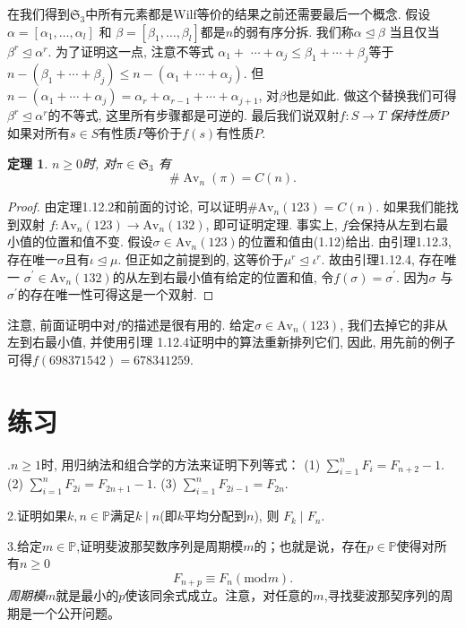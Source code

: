 \documentclass{ctexbook}
\newtheorem{thm}{定理}[section]
\begin{document}
在我们得到$\mathfrak{S}_{3}$中所有元素都是Wilf等价的结果之前还需要最后一个概念. 假设
$\alpha=\left[\alpha_{1}, \ldots, \alpha_{l}\right]$ 和 $\beta=\left[\beta_{1}, \ldots, \beta_{l}\right]$都是$n$的弱有序分拆.
我们称$\alpha \unlhd \beta$ 当且仅当 $\beta^{r} \unlhd \alpha^{r}$. 为了证明这一点, 注意不等式
$\alpha_{1}+$ $\cdots+\alpha_{j} \leqslant \beta_{1}+\cdots+\beta_{j}$等于
$n-\left(\beta_{1}+\cdots+\beta_{j}\right) \leqslant n-\left(\alpha_{1}+\cdots+\alpha_{j}\right)$.
但$n-\left(\alpha_{1}+\cdots+\alpha_{j}\right)=\alpha_{r}+\alpha_{r-1}+\cdots+\alpha_{j+1}$, 对$\beta$也是如此.
做这个替换我们可得$\beta^{r} \unlhd \alpha^{r}$的不等式, 这里所有步骤都是可逆的. 最后我们说双射$f: S \rightarrow T$
\textsl{保持性质}$P$如果对所有$s \in S$有性质$P$等价于$f(s)$有性质$P$.
     \begin{thm}
     	$n \geqslant 0$时, 对$\pi \in \mathfrak{S}_{3}$ 有
     	$$
     	\# \operatorname{Av}_{n}(\pi)=C(n).
     	$$
     \end{thm}
     \begin{proof}
     由定理1.12.2和前面的讨论, 可以证明$\# \mathrm{Av}_{n}(123)=C(n)$. 如果我们能找到双射 $f: \mathrm{Av}_{n}(123) \rightarrow \mathrm{Av}_{n}(132)$,
     即可证明定理. 事实上, $f$会保持从左到右最小值的位置和值不变. 假设$\sigma \in \mathrm{Av}_{n}(123)$的位置和值由(1.12)给出.
     由引理1.12.3, 存在唯一$\sigma$且有$\iota \unlhd \mu$. 但正如之前提到的, 这等价于$\mu^{r} \unlhd \iota^{r}$.
     故由引理1.12.4, 存在唯一 $\sigma^{\prime} \in \mathrm{Av}_{n}(132)$的从左到右最小值有给定的位置和值, 令$f(\sigma)=\sigma^{\prime}$.
     因为$\sigma$ 与 $\sigma^{\prime}$的存在唯一性可得这是一个双射.
     \end{proof}


注意, 前面证明中对$f$的描述是很有用的. 给定$\sigma \in \mathrm{Av}_{n}(123)$, 我们去掉它的非从左到右最小值, 并使用引理
1.12.4证明中的算法重新排列它们, 因此, 用先前的例子可得$f(698371542)=678341259$.

\section{练习}
.$n \geqslant 1$时, 用归纳法和组合学的方法来证明下列等式：
(1) $\sum_{i=1}^{n} F_{i}=F_{n+2}-1$.
(2) $\sum_{i=1}^{n} F_{2 i}=F_{2 n+1}-1$.
(3) $\sum_{i=1}^{n} F_{2 i-1}=F_{2 n}$.

\noindent2.证明如果$k, n \in \mathbb{P}$满足$k \mid n$(即$k$平均分配到$n$), 则 $F_{k} \mid F_{n}$.

\noindent3.给定$m\in \mathbb{P}$,证明斐波那契数序列是周期模$m$的；也就是说，存在$p\in \mathbb{P}$使得对所有$n\geq 0$\[
F_{n+p}\equiv F_{n}(\text{mod} m).
\]\textsl{周期模$m$}就是最小的$p$使该同余式成立。注意，对任意的$m$,寻找斐波那契序列的周期是一个公开问题。
\end{document}

